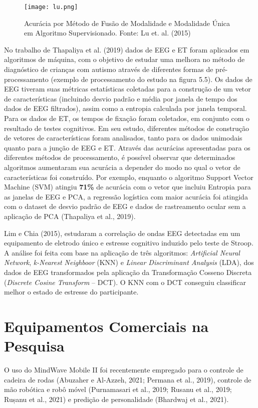 \begin{figure}
      \centering
      \texttt{[image: lu.png]}
      \caption{Acurácia por Método de Fusão de Modalidade e Modalidade Única em Algoritmo Supervisionado. Fonte: Lu et. al. (2015)}
\end{figure}

No trabalho de Thapaliya et al. (2019) dados de EEG e ET foram aplicados em algoritmos de máquina, 
com o objetivo de estudar uma melhora no método de diagnóstico de crianças com autismo através de 
diferentes formas de pré-processamento (exemplo de processamento do estudo na figura 5.5). 
Os dados de EEG tiveram suas métricas estatísticas coletadas para a construção de um vetor de características 
(incluindo desvio padrão e média por janela de tempo dos dados de EEG filtrados), assim como a entropia calculada 
por janela temporal. Para os dados de ET, os tempos de fixação foram coletados, em conjunto com o resultado de testes cognitivos. 
Em seu estudo, diferentes métodos de construção de vetores de características foram analisados, 
tanto para os dados unimodais quanto para a junção de EEG e ET. 
Através das acurácias apresentadas para os diferentes métodos de processamento, 
é possível observar que determinados algoritmos aumentaram sua acurácia a
 depender do modo no qual o vetor de características foi construído. 
 Por exemplo, enquanto o algoritmo Support Vector Machine (SVM) atingiu \textbf{71\%} de acurácia 
 com o vetor que incluiu Entropia para as janelas de EEG e PCA, a regressão logística com maior acurácia 
 foi atingida com o dataset de desvio padrão de EEG e dados de rastreamento ocular sem a aplicação de PCA 
 (Thapaliya et al., 2019). 

Lim e Chia (2015), estudaram a correlação de ondas EEG detectadas em um equipamento de eletrodo único e 
estresse cognitivo induzido pelo teste de Stroop. A análise foi feita com base na aplicação de três algoritmos: 
\textit{Artificial Neural Network}, \textit{k-Nearest Neighboor} (KNN) e \textit{Linear Discriminant Analysis} (LDA), 
dos dados de EEG transformados pela aplicação da Transformação Cosseno Discreta (\textit{Discrete Cosine Transform} – DCT). 
O KNN com o DCT conseguiu classificar melhor o estado de estresse do participante.

\section{Equipamentos Comerciais na Pesquisa}

O uso do MindWave Mobile II foi recentemente empregado para o 
controle de cadeira de rodas (Abuzaher e Al-Azzeh, 2021; Permana et al., 2019), 
controle de mão robótica e robô móvel (Purnamasari et al., 2019; Rusanu et al., 2019; Rușanu et al., 2021) 
e predição de personalidade (Bhardwaj et al., 2021). 

